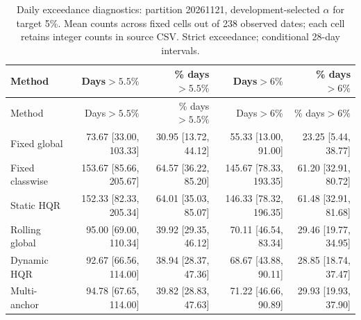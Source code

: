 \begingroup\small\setlength{\tabcolsep}{3pt}
\begin{longtable}{lrrrr}
\caption{Daily exceedance diagnostics: partition 20261121, development-selected $\alpha$ for target 5\%. Mean counts across fixed cells out of 238 observed dates; each cell retains integer counts in source CSV. Strict exceedance; conditional 28-day intervals.}\label{tab:final-risk-0-1-exceed}\\
\toprule
Method & Days$>5.5\%$ & \% days$>5.5\%$ & Days$>6\%$ & \% days$>6\%$\\
\midrule
\endfirsthead
\toprule
Method & Days$>5.5\%$ & \% days$>5.5\%$ & Days$>6\%$ & \% days$>6\%$\\
\midrule
\endhead
Fixed global & 73.67 [33.00, 103.33] & 30.95 [13.72, 44.12] & 55.33 [13.00, 91.00] & 23.25 [5.44, 38.77]\\
Fixed classwise & 153.67 [85.66, 205.67] & 64.57 [36.22, 85.20] & 145.67 [78.33, 193.35] & 61.20 [32.91, 80.72]\\
Static HQR & 152.33 [82.33, 205.34] & 64.01 [35.03, 85.07] & 146.33 [78.32, 196.35] & 61.48 [32.91, 81.68]\\
Rolling global & 95.00 [69.00, 110.34] & 39.92 [29.35, 46.12] & 70.11 [46.54, 83.34] & 29.46 [19.77, 34.95]\\
Dynamic HQR & 92.67 [66.56, 114.00] & 38.94 [28.37, 47.36] & 68.67 [43.88, 90.11] & 28.85 [18.74, 37.47]\\
Multi-anchor & 94.78 [67.65, 114.00] & 39.82 [28.83, 47.63] & 71.22 [46.66, 90.89] & 29.93 [19.93, 37.90]\\
\bottomrule
\end{longtable}
\endgroup
